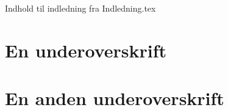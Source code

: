 Indhold til indledning fra Indledning.tex

\section*{En underoverskrift}
\section{En anden underoverskrift}
